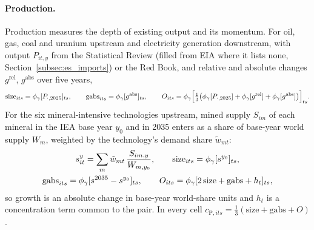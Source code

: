 \paragraph{Production.}\label{subsec:eo_production} Production measures the depth of existing
output and its momentum. For oil, gas, coal and uranium upstream and electricity generation
downstream, with output $P_{it,y}$ from the Statistical Review \citep{ei2026statistical} (filled
from EIA where it lists none, Section~\ref{subsec:es_imports}) or the Red Book, and relative and
absolute changes $g^{\mathrm{rel}}$, $g^{\mathrm{abs}}$ over five years,
\begin{equation}\label{eq:eo_prod_energy}
  \mathrm{size}_{its}=\phi_{\gamma}[P_{\cdot,2025}]_{ts},\qquad
  \mathrm{gabs}_{its}=\phi_{\gamma}[g^{\mathrm{abs}}]_{ts},\qquad
  O_{its}=\phi_{\gamma}\Big[\tfrac13\big(\phi_{\gamma}[P_{\cdot,2025}]+\phi_{\gamma}[g^{\mathrm{rel}}]
  +\phi_{\gamma}[g^{\mathrm{abs}}]\big)\Big]_{ts}.
\end{equation}
For the six mineral-intensive technologies upstream, mined supply $S_{im}$ of each mineral in the
IEA base year $y_0$ and in 2035 \citep{iea2026cmdata} enters as a share of base-year world supply
$W_m$, weighted by the technology's demand share $\tilde w_{mt}$:
\begin{equation}\label{eq:eo_prod_mineral}
\begin{gathered}
  s^{y}_{it}=\sum_{m}\tilde w_{mt}\,\frac{S_{im,y}}{W_{m,y_0}},\qquad
  \mathrm{size}_{its}=\phi_{\gamma}[s^{y_0}]_{ts},\\
  \mathrm{gabs}_{its}=\phi_{\gamma}[s^{2035}-s^{y_0}]_{ts},\qquad
  O_{its}=\phi_{\gamma}[2\,\mathrm{size}+\mathrm{gabs}+h_t]_{ts},
\end{gathered}
\end{equation}
so growth is an absolute change in base-year world-share units and $h_t$ is a concentration term
common to the pair. In every cell $c_{\mathrm{P},its}=\tfrac13(\mathrm{size}+\mathrm{gabs}+O)$.

